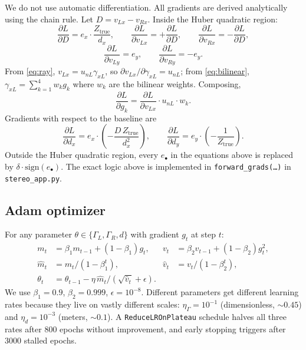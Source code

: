 \documentclass[11pt]{article}
\begin{document}
We do not use automatic differentiation. All gradients are derived analytically using the
chain rule. Let $D = v_{Lx} - v_{Rx}$. Inside the Huber quadratic region:
\begin{equation}
\frac{\partial L}{\partial D} = e_x \cdot \frac{Z_\text{true}}{d_x},
\qquad
\frac{\partial L}{\partial v_{Lx}} = +\frac{\partial L}{\partial D},
\qquad
\frac{\partial L}{\partial v_{Rx}} = -\frac{\partial L}{\partial D},
\end{equation}
\begin{equation}
\frac{\partial L}{\partial v_{Ly}} = e_y,
\qquad
\frac{\partial L}{\partial v_{Ry}} = -e_y.
\end{equation}
From \eqref{eq:ray}, $v_{Lx} = u_{nL} \gamma_{xL}$, so $\partial v_{Lx} / \partial \gamma_{xL} =
u_{nL}$; from \eqref{eq:bilinear}, $\gamma_{xL} = \sum_{k=1}^4 w_k g_k$ where $w_k$ are
the bilinear weights. Composing,
\begin{equation}
\frac{\partial L}{\partial g_k}
= \frac{\partial L}{\partial v_{Lx}} \cdot u_{nL} \cdot w_k.
\label{eq:dLdg}
\end{equation}
Gradients with respect to the baseline are
\begin{equation}
\frac{\partial L}{\partial d_x} = e_x \cdot \left(-\frac{D\, Z_\text{true}}{d_x^2}\right),
\qquad
\frac{\partial L}{\partial d_y} = e_y \cdot \left(-\frac{1}{Z_\text{true}}\right).
\end{equation}
Outside the Huber quadratic region, every $e_\bullet$ in the equations above is replaced
by $\delta \cdot \text{sign}(e_\bullet)$. The exact logic above is implemented in
\texttt{forward\_grads(\dots)} in \texttt{stereo\_app.py}.

\subsection{Adam optimizer}

For any parameter $\theta \in \{\Gamma_L, \Gamma_R, d\}$ with gradient $g_t$ at step $t$:
\begin{align}
m_t &= \beta_1 m_{t-1} + (1 - \beta_1) g_t, &
v_t &= \beta_2 v_{t-1} + (1 - \beta_2) g_t^2, \\
\hat m_t &= m_t / (1 - \beta_1^t), &
\hat v_t &= v_t / (1 - \beta_2^t), \\
\theta_t &= \theta_{t-1} - \eta \, \hat m_t / (\sqrt{\hat v_t} + \epsilon).
\end{align}
We use $\beta_1 = 0.9$, $\beta_2 = 0.999$, $\epsilon = 10^{-8}$. Different parameters get
different learning rates because they live on vastly different scales: $\eta_\Gamma =
10^{-1}$ (dimensionless, $\sim 0.45$) and $\eta_d = 10^{-3}$ (meters, $\sim 0.1$). A
\texttt{ReduceLROnPlateau} schedule halves all three rates after $800$ epochs without
improvement, and early stopping triggers after $3000$ stalled epochs.
\end{document}
